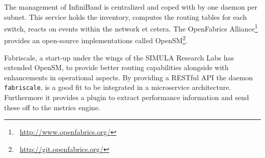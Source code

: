 The management of InfiniBand is centralized and coped with by one daemon per subnet. This service holds the inventory,
computes the routing tables for each switch, reacts on events within the network et cetera.
The OpenFabrics Alliance\footnote{\Mundus~\url{http://www.openfabrics.org/}} provides an open-source implementations called OpenSM\footnote{\Mundus~\url{http://git.openfabrics.org/}}.


Fabriscale, a start-up under the wings of the SIMULA Research Labs has extended OpenSM,
to provide better routing capabilities alongside with enhancements in operational aspects.
By providing a RESTful API the daemon \texttt{fabriscale}, is a good fit to be integrated in
a microservice architecture. Furthermore it provides a plugin to extract performance information and send these off to the metrics engine.
